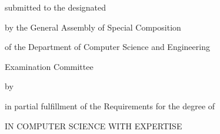 \thispagestyle{empty}
\makeatletter

{\LARGE \@title}

{\Large
	\vfill \vfill \csethesisTypeEn

	\vfill        submitted to the designated

	\vfill        by the General Assembly of Special Composition

	              of the Department of Computer Science and Engineering

	              Examination Committee

	\vfill        by

	\vfill        {\LARGE \@author}

	\vfill        in partial fulfillment of the Requirements for the degree of

	\vfill        \csediplwmaEn

	              IN COMPUTER SCIENCE
	\ifPhD\else
		          WITH EXPERTISE
			
		          \@Ekseidikseusi
	\fi

	\vfill \vfill \@date
}

\clearpage
